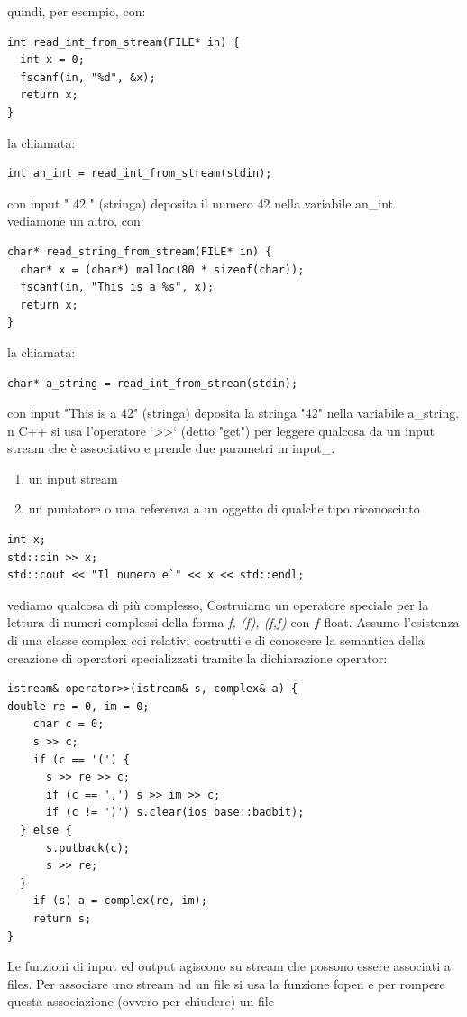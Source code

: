 \documentclass[a4paper,12pt, oneside]{book}
\begin{document}
	quindi, per esempio, con:
	\begin{verbatim}
int read_int_from_stream(FILE* in) {
  int x = 0;
  fscanf(in, "%d", &x);
  return x;
}
\end{verbatim}
	la chiamata:
	\begin{verbatim}
int an_int = read_int_from_stream(stdin);
\end{verbatim}
	con input " 42 " (stringa) deposita il numero 42 nella variabile
	an\_int\\
	vediamone un altro, con:
	\begin{verbatim}
char* read_string_from_stream(FILE* in) {
  char* x = (char*) malloc(80 * sizeof(char));
  fscanf(in, "This is a %s", x);
  return x;
}
\end{verbatim}
	la chiamata:
	\begin{verbatim}
char* a_string = read_int_from_stream(stdin);
\end{verbatim}
	con input "This is a 42" (stringa) deposita la stringa "42"
	nella variabile a\_string.\\
	n C++ si usa l'operatore ‘>>‘ (detto "get") per leggere qualcosa da un input stream che è associativo e prende due parametri in input\_:
	\begin{enumerate}
		\item un input stream
		\item un puntatore o una referenza a un oggetto di qualche tipo riconosciuto
	\end{enumerate}
	\begin{verbatim}
int x;
std::cin >> x;
std::cout << "Il numero e`" << x << std::endl;
\end{verbatim}
	vediamo qualcosa di più complesso, Costruiamo un operatore speciale per la lettura di numeri
	complessi della forma \textit{f, (f), (f,f)} con $f$ float. Assumo l'esistenza di una classe complex coi relativi costrutti e di conoscere la semantica della creazione di operatori specializzati
tramite la dichiarazione operator:
\begin{verbatim}
istream& operator>>(istream& s, complex& a) {
double re = 0, im = 0;
    char c = 0;
    s >> c;
    if (c == '(') {
      s >> re >> c;
      if (c == ',') s >> im >> c;
      if (c != ')') s.clear(ios_base::badbit);
  } else {
      s.putback(c);
      s >> re;
  }
    if (s) a = complex(re, im);
    return s;
}
\end{verbatim}
Le funzioni di input ed output agiscono su stream che possono
essere associati a files. Per associare uno stream ad un file si usa la funzione fopen e per rompere questa associazione (ovvero per chiudere) un file
\end{document}
